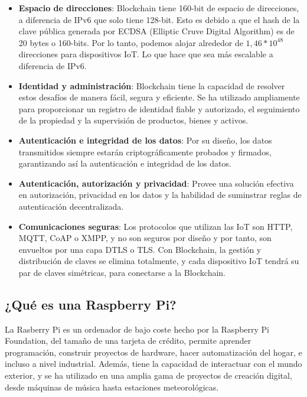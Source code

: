 \begin{itemize}
    \item \textbf{Espacio de direcciones}: Blockchain tiene 160-bit de espacio de direcciones, a diferencia de IPv6
    que solo tiene 128-bit. Esto es debido a que el hash de la clave pública generada por ECDSA (Elliptic Cruve Digital
    Algorithm) es de 20 bytes o 160-bits. Por lo tanto, podemos alojar alrededor de \(1,46*10^{48}\) direcciones para 
    dispositivos IoT. Lo que hace que sea más escalable a diferencia de IPv6. 
    \item \textbf{Identidad y administración}: Blockchain tiene la capacidad de resolver estos desafíos de manera fácil, 
    segura y eficiente. Se ha utilizado ampliamente para proporcionar un registro de identidad fiable y autorizado, 
    el seguimiento de la propiedad y la supervisión de productos, bienes y activos.
    \item \textbf{Autenticación e integridad de los datos}: Por su diseño, los datos transmitidos siempre estarán
    criptográficamente probados y firmados, garantizando así la autenticación e integridad de los datos.
    \item \textbf{Autenticación, autorización y privacidad}: Provee una solución efectiva en autorización, privacidad en
    los datos y la habilidad de suminstrar reglas de autenticación decentralizada. 
    \item \textbf{Comunicaciones seguras}: Los protocolos que utilizan las IoT son HTTP, MQTT, CoAP o XMPP, y no son 
    seguros por diseño y por tanto, son envueltos por una capa DTLS o TLS. Con Blockchain, la gestión y distribución 
    de claves se elimina totalmente, y cada dispositivo IoT tendrá su par de claves simétricas, para conectarse a la 
    Blockchain.
\end{itemize}

\subsection{¿Qué es una Raspberry Pi?}

La Rasberry Pi es un ordenador de bajo coste hecho por la Raspberry Pi Foundation, del tamaño de una tarjeta de crédito, 
permite aprender programación, construir proyectos de hardware, hacer automatización del hogar, e incluso a nivel 
industrial. Además, tiene la capacidad de interactuar con el mundo exterior, y se ha utilizado en una amplia gama de 
proyectos de creación digital, desde máquinas de música hasta estaciones meteorológicas.


